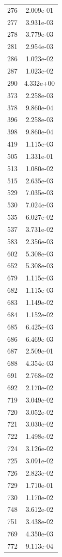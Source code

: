 \documentclass[12pt]{article}
\begin{document}
\begin{longtable}{@{}cc@{}}
276 & 2.009e-01 \\
277 & 3.931e-03 \\
278 & 3.779e-03 \\
281 & 2.954e-03 \\
286 & 1.023e-02 \\
287 & 1.023e-02 \\
290 & 4.332e+00 \\
373 & 2.258e-03 \\
378 & 9.860e-04 \\
396 & 2.258e-03 \\
398 & 9.860e-04 \\
419 & 1.115e-03 \\
505 & 1.331e-01 \\
513 & 1.080e-02 \\
515 & 2.635e-03 \\
529 & 7.035e-03 \\
530 & 7.024e-03 \\
535 & 6.027e-02 \\
537 & 3.731e-02 \\
583 & 2.356e-03 \\
602 & 5.308e-03 \\
652 & 5.308e-03 \\
679 & 1.115e-03 \\
682 & 1.115e-03 \\
683 & 1.149e-02 \\
684 & 1.152e-02 \\
685 & 6.425e-03 \\
686 & 6.469e-03 \\
687 & 2.509e-01 \\
688 & 4.354e-03 \\
691 & 2.768e-02 \\
692 & 2.170e-02 \\
719 & 3.049e-02 \\
720 & 3.052e-02 \\
721 & 3.030e-02 \\
722 & 1.498e-02 \\
724 & 3.126e-02 \\
725 & 3.091e-02 \\
726 & 2.823e-02 \\
729 & 1.710e-01 \\
730 & 1.170e-02 \\
748 & 3.612e-02 \\
751 & 3.438e-02 \\
769 & 4.350e-03 \\
772 & 9.113e-04 \\

\end{longtable}
\end{document}
